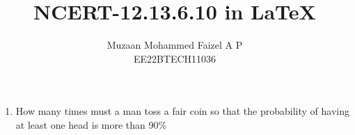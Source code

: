 \documentclass[journal,12pt,twocolumn]{IEEEtran}
\begin{document}

\vspace{3cm}
\title{
NCERT-12.13.6.10 in \LaTeX
}
\author{ Muzaan Mohammed Faizel A P\\
EE22BTECH11036
}	
\maketitle
\begin{flushleft}
\begin{enumerate}
  \item How many times must a man toss a fair coin so that the probability of having at least one head is more than 90\%
\end{enumerate}
\end{flushleft}
\end{document}
